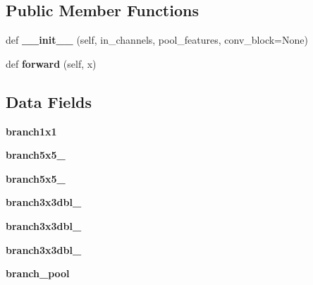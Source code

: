 \subsection*{Public Member Functions}
\begin{DoxyCompactItemize}
\item 
\mbox{\label{classtorchvision_1_1models_1_1inception_1_1InceptionA_a68372acbf756e6ad412eacdc9b80c194}} 
def {\bfseries \+\_\+\+\_\+init\+\_\+\+\_\+} (self, in\+\_\+channels, pool\+\_\+features, conv\+\_\+block=None)
\item 
\mbox{\label{classtorchvision_1_1models_1_1inception_1_1InceptionA_a88c6f55c79e8e44baa6531f5f29a7cee}} 
def {\bfseries forward} (self, x)
\end{DoxyCompactItemize}
\subsection*{Data Fields}
\begin{DoxyCompactItemize}
\item 
\mbox{\label{classtorchvision_1_1models_1_1inception_1_1InceptionA_a01c825ae94104be9eba8c0547de59a67}} 
{\bfseries branch1x1}
\item 
\mbox{\label{classtorchvision_1_1models_1_1inception_1_1InceptionA_a9d6290bf0d98242e7f45ea8adc6f0c15}} 
{\bfseries branch5x5\+\_}
\item 
\mbox{\label{classtorchvision_1_1models_1_1inception_1_1InceptionA_a12bc64d0d2c42b321614b86c204909ac}} 
{\bfseries branch5x5\+\_}
\item 
\mbox{\label{classtorchvision_1_1models_1_1inception_1_1InceptionA_a3ad86389aafac4f4cf8e41444d8e0b1e}} 
{\bfseries branch3x3dbl\+\_}
\item 
\mbox{\label{classtorchvision_1_1models_1_1inception_1_1InceptionA_af9859848e32e215b1077d64ce32a5362}} 
{\bfseries branch3x3dbl\+\_}
\item 
\mbox{\label{classtorchvision_1_1models_1_1inception_1_1InceptionA_a7c218dda15c674283af2b282268feec9}} 
{\bfseries branch3x3dbl\+\_}
\item 
\mbox{\label{classtorchvision_1_1models_1_1inception_1_1InceptionA_a62060a039ea21a49a5ee0d24bc1ef979}} 
{\bfseries branch\+\_\+pool}
\end{DoxyCompactItemize}


